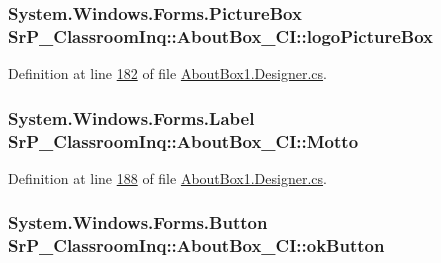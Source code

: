 \hypertarget{class_sr_p___classroom_inq_1_1_about_box___c_i_abc53ccfd3fe852b430d0542030f8ebf4}{
\subsubsection[{logo\-Picture\-Box}]{\setlength{\rightskip}{0pt plus 5cm}\-System.\-Windows.\-Forms.\-Picture\-Box {\bf \-Sr\-P\-\_\-\-Classroom\-Inq\-::\-About\-Box\-\_\-\-C\-I\-::logo\-Picture\-Box}}}
\label{class_sr_p___classroom_inq_1_1_about_box___c_i_abc53ccfd3fe852b430d0542030f8ebf4}


\-Definition at line \hyperlink{_about_box1_8_designer_8cs_source_l00182}{182} of file \hyperlink{_about_box1_8_designer_8cs_source}{\-About\-Box1.\-Designer.\-cs}.

\hypertarget{class_sr_p___classroom_inq_1_1_about_box___c_i_a9e0b3276b452249890107b395c953e57}{
\subsubsection[{\-Motto}]{\setlength{\rightskip}{0pt plus 5cm}\-System.\-Windows.\-Forms.\-Label {\bf \-Sr\-P\-\_\-\-Classroom\-Inq\-::\-About\-Box\-\_\-\-C\-I\-::\-Motto}}}
\label{class_sr_p___classroom_inq_1_1_about_box___c_i_a9e0b3276b452249890107b395c953e57}


\-Definition at line \hyperlink{_about_box1_8_designer_8cs_source_l00188}{188} of file \hyperlink{_about_box1_8_designer_8cs_source}{\-About\-Box1.\-Designer.\-cs}.

\hypertarget{class_sr_p___classroom_inq_1_1_about_box___c_i_a1fba7bba76046a6ef3254d7f02cd88bb}{
\subsubsection[{ok\-Button}]{\setlength{\rightskip}{0pt plus 5cm}\-System.\-Windows.\-Forms.\-Button {\bf \-Sr\-P\-\_\-\-Classroom\-Inq\-::\-About\-Box\-\_\-\-C\-I\-::ok\-Button}}}
\label{class_sr_p___classroom_inq_1_1_about_box___c_i_a1fba7bba76046a6ef3254d7f02cd88bb}


